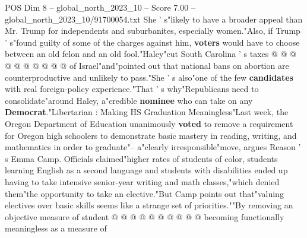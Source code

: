 \begin{textsample}{POS Dim 8 – global\_north\_2023\_10 – Score 7.00 – global\_north\_2023\_10/91700054.txt}
She ' s"likely to have a broader appeal than Mr.
Trump for independents and suburbanites, especially women."Also, if Trump ' s"found guilty of some of the charges against him, \textbf{voters} would have to choose between an old felon and an old fool."Haley"cut South Carolina ' s taxes @ @ @ @ @ @ @ @ @ @ of Israel"and"pointed out that national bans on abortion are counterproductive and unlikely to pass."She ' s also"one of the few \textbf{candidates} with real foreign-policy experience."That ' s why"Republicans need to consolidate"around Haley, a"credible \textbf{nominee} who can take on any \textbf{Democrat}."Libertarian : Making HS Graduation Meaningless"Last week, the Oregon Department of Education unanimously \textbf{voted} to remove a requirement for Oregon high schoolers to demonstrate basic mastery in reading, writing, and mathematics in order to graduate"-- a"clearly irresponsible"move, argues Reason ' s Emma Camp.
Officials claimed"higher rates of students of color, students learning English as a second language and students with disabilities ended up having to take intensive senior-year writing and math classes,"which denied them"the opportunity to take an elective."But Camp points out that"valuing electives over basic skills seems like a strange set of priorities.""By removing an objective measure of student @ @ @ @ @ @ @ @ @ @ becoming functionally meaningless as a measure of

\end{textsample}
